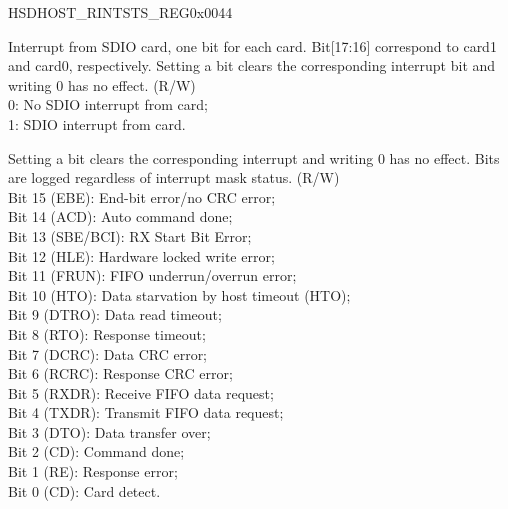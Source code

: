 \begin{register}{H}{SDHOST\_RINTSTS\_REG}{0x{}0044}\label{regdesc:RINTSTSREG}
%
%
%
\regnewline%
\begin{regdesc}\begin{reglist}
\item [SDHOST\_SDIO\_INTERRUPT\_RAW] Interrupt from SDIO card, one bit for each card. Bit[17:16] correspond to card1 and card0, respectively. Setting a bit clears the corresponding interrupt bit and writing 0 has no effect. (R/W)\\
0: No SDIO interrupt from card;\\
1: SDIO interrupt from card.
\item [SDHOST\_INT\_STATUS\_RAW] Setting a bit clears the corresponding interrupt and writing 0 has no effect. Bits are logged regardless of interrupt mask status. (R/W)\\
Bit 15 (EBE): End-bit error/no CRC error;\\
Bit 14 (ACD): Auto command done;\\
Bit 13 (SBE/BCI): RX Start Bit Error;\\
Bit 12 (HLE): Hardware locked write error; \\
Bit 11 (FRUN): FIFO underrun/overrun error;\\
Bit 10 (HTO): Data starvation by host timeout (HTO);\\
Bit 9 (DTRO): Data read timeout; \\
Bit 8 (RTO): Response timeout; \\
Bit 7 (DCRC): Data CRC error; \\
Bit 6 (RCRC): Response CRC error; \\
Bit 5 (RXDR): Receive FIFO data request; \\
Bit 4 (TXDR): Transmit FIFO data request;\\
Bit 3 (DTO): Data transfer over; \\
Bit 2 (CD): Command done; \\
Bit 1 (RE): Response error;\\
Bit 0 (CD): Card detect.
\end{reglist}\end{regdesc}
\end{register}


